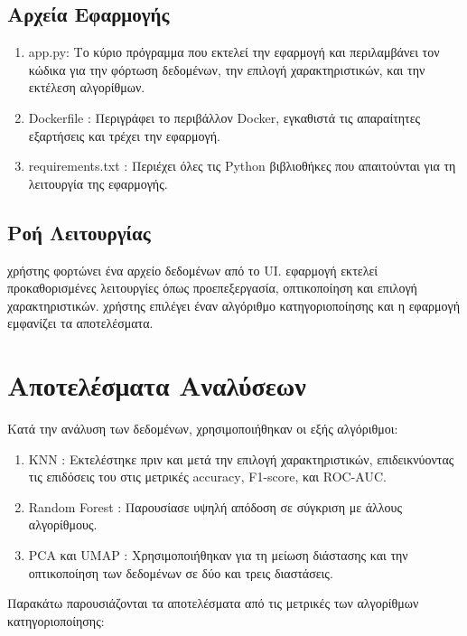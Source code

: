 \documentclass[a4paper,12pt]{article}
\begin{document}
\subsection{Αρχεία Εφαρμογής}
\begin{enumerate}
\item\textlatin{app.py}: Το κύριο πρόγραμμα που εκτελεί την εφαρμογή και περιλαμβάνει τον κώδικα για την φόρτωση δεδομένων, την επιλογή χαρακτηριστικών, και την εκτέλεση αλγορίθμων.
\item\textlatin{Dockerfile}  : Περιγράφει το περιβάλλον \textlatin{Docker}, εγκαθιστά τις απαραίτητες εξαρτήσεις και τρέχει την εφαρμογή.
\item\textlatin{requirements.txt}  : Περιέχει όλες τις \textlatin{Python} βιβλιοθήκες που απαιτούνται για τη λειτουργία της εφαρμογής.
\end{enumerate}

\subsection{Ροή Λειτουργίας}
\begin{enumerate}
 χρήστης φορτώνει ένα αρχείο δεδομένων από το \textlatin{UI}.
 εφαρμογή εκτελεί προκαθορισμένες λειτουργίες όπως προεπεξεργασία, οπτικοποίηση και επιλογή χαρακτηριστικών.
 χρήστης επιλέγει έναν αλγόριθμο κατηγοριοποίησης και η εφαρμογή εμφανίζει τα αποτελέσματα.
\end{enumerate}

\section{Αποτελέσματα Αναλύσεων}

Κατά την ανάλυση των δεδομένων, χρησιμοποιήθηκαν οι εξής αλγόριθμοι:
\begin{enumerate}
\item\textlatin{KNN}  : Εκτελέστηκε πριν και μετά την επιλογή χαρακτηριστικών, επιδεικνύοντας τις επιδόσεις του στις μετρικές \textlatin{accuracy}, \textlatin{F1-score}, και \textlatin{ROC-AUC}.
\item\textlatin{Random Forest}  : Παρουσίασε υψηλή απόδοση σε σύγκριση με άλλους αλγορίθμους.
\item\textlatin{PCA} και \textlatin{UMAP}  : Χρησιμοποιήθηκαν για τη μείωση διάστασης και την οπτικοποίηση των δεδομένων σε δύο και τρεις διαστάσεις.
\end{enumerate}
Παρακάτω παρουσιάζονται τα αποτελέσματα από τις μετρικές των αλγορίθμων κατηγοριοποίησης:
\end{document}
